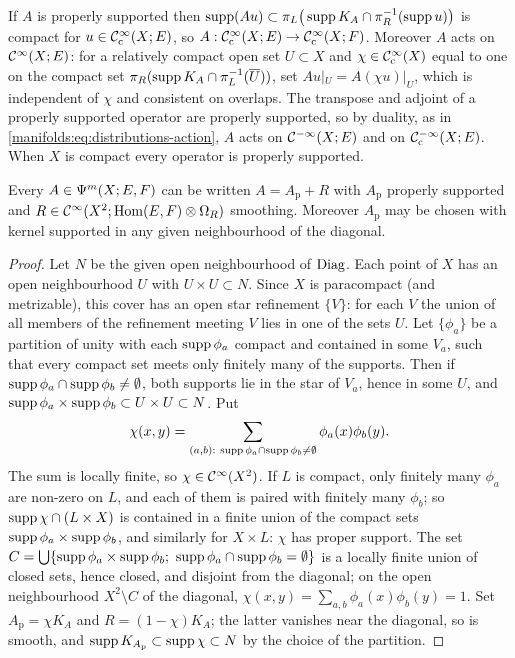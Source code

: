 If $A$ is properly supported then $\operatorname{supp}(Au)\subset\pi_L\big(\operatorname{supp} K_A\cap\pi_R^{-1}(\operatorname{supp} u)\big)$
is compact for $u\in\mathcal{C}^\infty_{\mathrm{c}}(X;E)$, so $A:\mathcal{C}^\infty_{\mathrm{c}}(X;E)\to\mathcal{C}^\infty_{\mathrm{c}}(X;F)$. Moreover $A$ acts on
$\mathcal{C}^\infty(X;E)$: for a relatively compact open set $U\subset X$ and $\chi\in\mathcal{C}^\infty_{\mathrm{c}}(X)$
equal to one on the compact set $\pi_R(\operatorname{supp} K_A\cap\pi_L^{-1}(\overline U))$,
set $Au|_U=A(\chi u)|_U$, which is independent of $\chi$ and consistent on
overlaps. The transpose and adjoint of a properly supported operator are
properly supported, so by duality, as in
\eqref{manifolds:eq:distributions-action}, $A$ acts on $\mathcal{C}^{-\infty}(X;E)$ and on
$\mathcal{C}^{-\infty}_{\mathrm{c}}(X;E)$. When $X$ is compact every operator is properly supported.

\begin{lemma}\label{manifolds:lem:proper}
Every $A\in\Psi^{m}(X;E,F)$ can be written $A=A_{\mathrm p}+R$ with $A_{\mathrm p}$
properly supported and $R\in\mathcal{C}^\infty(X^2;\operatorname{Hom}(E,F)\otimes\Omega_R)$ smoothing.
Moreover $A_{\mathrm p}$ may be chosen with kernel supported in any given
neighbourhood of the diagonal.
\end{lemma}
\begin{proof}
Let $N$ be the given open neighbourhood of $\operatorname{Diag}$. Each point of $X$ has an open
neighbourhood $U$ with $U\times U\subset N$. Since $X$ is paracompact (and
metrizable), this cover has an open star refinement $\{V\}$: for each $V$ the union
of all members of the refinement meeting $V$ lies in one of the sets $U$. Let
$\{\phi_a\}$ be a partition of unity with each $\operatorname{supp}\phi_a$ compact and contained in
some $V_a$, such that every compact set meets only finitely many of the supports.
Then if $\operatorname{supp}\phi_a\cap\operatorname{supp}\phi_b\ne\emptyset$, both supports lie in the star of
$V_a$, hence in some $U$, and $\operatorname{supp}\phi_a\times\operatorname{supp}\phi_b\subset U\times U\subset N$. Put
\begin{equation*}
\chi(x,y)=\sum_{(a,b):\ \supp\phi_a\cap\supp\phi_b\ne\emptyset}\phi_a(x)\phi_b(y).
\end{equation*}
The sum is locally finite, so $\chi\in\mathcal{C}^\infty(X^2)$. If $L$ is compact, only finitely
many $\phi_a$ are non-zero on $L$, and each of them is paired with finitely many
$\phi_b$; so $\operatorname{supp}\chi\cap(L\times X)$ is contained in a finite union of the compact
sets $\operatorname{supp}\phi_a\times\operatorname{supp}\phi_b$, and similarly for $X\times L$: $\chi$ has proper
support. The set
$C=\bigcup\{\supp\phi_a\times\supp\phi_b;\ \supp\phi_a\cap\supp\phi_b=\emptyset\}$ is a
locally finite union of closed sets, hence closed, and disjoint from the
diagonal; on the open neighbourhood $X^2\setminus C$ of the diagonal,
$\chi(x,y)=\sum_{a,b}\phi_a(x)\phi_b(y)=1$. Set $A_{\mathrm p}=\chi K_A$ and
$R=(1-\chi)K_A$; the latter vanishes near the diagonal, so is smooth, and
$\operatorname{supp} K_{A_{\mathrm p}}\subset\operatorname{supp}\chi\subset N$ by the choice of the partition.
\end{proof}

